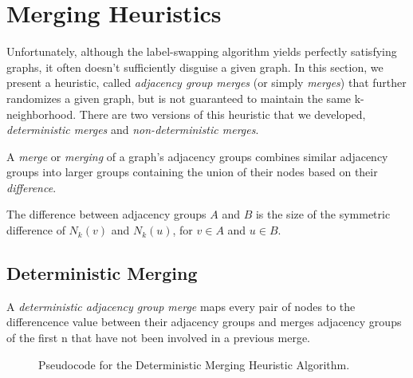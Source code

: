 \section{Merging Heuristics}
\indent Unfortunately, although the label-swapping algorithm yields perfectly satisfying graphs, it often doesn't sufficiently disguise a given graph.  In this section, we present a heuristic, called \emph{adjacency group merges} (or simply \emph{merges}) that further randomizes a given graph, but is not guaranteed to maintain the same k-neighborhood. There are two versions of this heuristic that we developed, \emph{deterministic merges} and \emph{non-deterministic merges}.

\begin{definition}
\noindent A \emph{merge} or \emph{merging} of a graph's adjacency groups combines similar adjacency groups into larger groups containing the union of their nodes based on their \emph{difference}.
\end{definition}

\begin{definition}
The difference between adjacency groups $A$ and $B$ is the size of the symmetric difference of $N_k(v)$ and $N_k(u)$, for $v \in A$ and $u \in B$. 
\end{definition}

\subsection{Deterministic Merging}

\begin{definition}
A \emph{deterministic adjacency group merge} maps every pair of nodes to  the differencence value between their adjacency groups and merges adjacency groups of the first n that have not been involved in a previous merge.
\end{definition}

\begin{figure}[htb]
	\begin{algorithmic}
		\renewcommand{\algorithmicrequire}{\textbf{Input:}}
		\renewcommand{\algorithmicensure}{\textbf{Output:}}
			\EndFor
		\EndFor
		\EndFor
			\EndIf
		\EndIf
	\end{algorithmic}
	\caption{Pseudocode for the Deterministic Merging Heuristic Algorithm.}
	\label{fig:deterministic-merging}
\end{figure}


